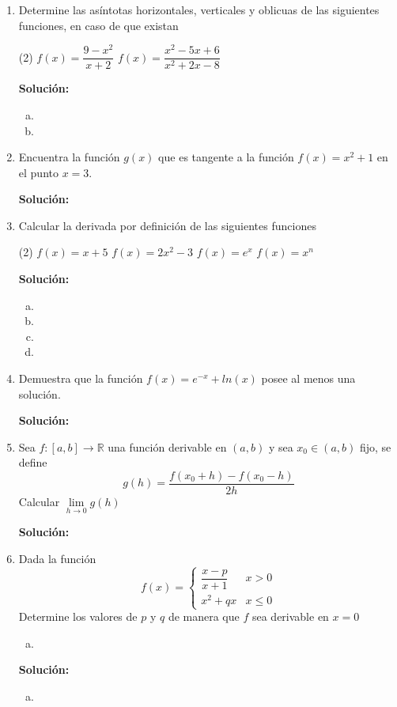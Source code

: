 \documentclass[12pt]{article}
\newenvironment{solucion}
{\begin{mdframed}[backgroundcolor=black!10]
		{\bf Solución:}\\
	}
	{
	\end{mdframed}
}
\newenvironment{preguntas}
{\begin{enumerate}\itemsep12pt
	}
	{
	\end{enumerate}
}
\newcommand{\ra}{\rightarrow}
\newcommand{\R}{\mathbb{R}}
\begin{document}
\begin{preguntas}
\item Determine las asíntotas horizontales, verticales y oblicuas de las siguientes funciones, en caso de que existan
\begin{tasks}(2)
\task $f(x) = \dfrac{9-x^2}{x+2}$
\task $f(x) = \dfrac{x^2-5x+6}{x^2+2x-8}$
\end{tasks}
\begin{solucion}

\begin{enumerate}[a)]
\item 
\item 
\end{enumerate}
\end{solucion}
\item Encuentra la función $g(x)$ que es tangente a la función $f(x) = x^2 + 1$ en el punto $x = 3$.
\begin{solucion}

\end{solucion}
\item Calcular la derivada por definición de las siguientes funciones
\begin{tasks}(2)
\task $f(x) = x+5$
\task $f(x) = 2x^2-3$
\task $f(x) = e^x$
\task $f(x) = x^n$
\end{tasks}
\begin{solucion}

\begin{enumerate}[a)]
\item 
\item 
\item 
\item 
\end{enumerate}
\end{solucion}
\item Demuestra que la función $f(x) = e^{-x} + ln(x)$ posee al menos una solución.
\begin{solucion}

\end{solucion}
\item Sea $f:[a,b] \ra \R$ una función derivable en $(a,b)$ y sea $x_0 \in (a,b)$ fijo, se define
$$ g(h) = \dfrac{f(x_0 + h) - f(x_0-h)}{2h}$$
Calcular $\lim\limits_{h \ra 0} g(h)$
\begin{solucion}

\end{solucion}
\item Dada la función
$$f(x) = \begin{cases}
\dfrac{x-p}{x+1} & x > 0\\
x^2+qx & x \leq 0
\end{cases}$$
Determine los valores de $p$ y $q$ de manera que $f$ sea derivable en $x=0$
\begin{enumerate}[a)]
\item 
\end{enumerate}
\begin{solucion}

\begin{enumerate}[a)]
\item 
\end{enumerate}
\end{solucion}
\end{preguntas}
\end{document}
